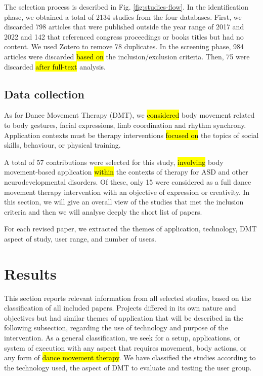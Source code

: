 \documentclass[a4paper,fleqn]{cas-sc}
\begin{document}
The selection process is described in Fig. \ref{fig:studies-flow}. 
In the identification phase, we obtained a total of 2134 studies from the four databases. First, we discarded 798 articles that were published outside the year range of 2017 and 2022 and 142 that referenced congress proceedings or books titles but had no content. We used Zotero to remove 78 duplicates. In the screening phase, 984 articles were discarded \hl{based on} the inclusion/exclusion criteria. Then, 75 were discarded \hl{after full-text} analysis. 

\subsection{Data collection}
As for Dance Movement Therapy (DMT), we \hl{considered} body movement related to body gestures, facial expressions, limb coordination and rhythm synchrony. Application contexts must be therapy interventions \hl{focused on} the topics of social skills, behaviour, or physical training.

A total of 57 contributions were selected for this study, \hl{involving} body movement-based application \hl{within} the contexts of therapy for ASD and other neurodevelopmental disorders. Of these, only 15 were considered as a full dance movement therapy intervention with an objective of expression or creativity. In this section, we will give an overall view of the studies that met the inclusion criteria and then we will analyse deeply the short list of papers.

For each revised paper, we extracted the themes of application, technology, DMT aspect of study, user range, and number of users.




\section{Results} 
\label{sec4:results}

This section reports relevant information from all selected studies, based on the classification of all included papers. Projects differed in its own nature and objectives but had similar themes of application that will be described in the following subsection, regarding the use of technology and purpose of the intervention. As a general classification, we seek for a setup, applications, or system of execution with any aspect that requires movement, body actions, or any form of \hl{dance movement therapy}. We have classified the studies according to the technology used, the aspect of DMT to evaluate and testing the user group.
\end{document}
